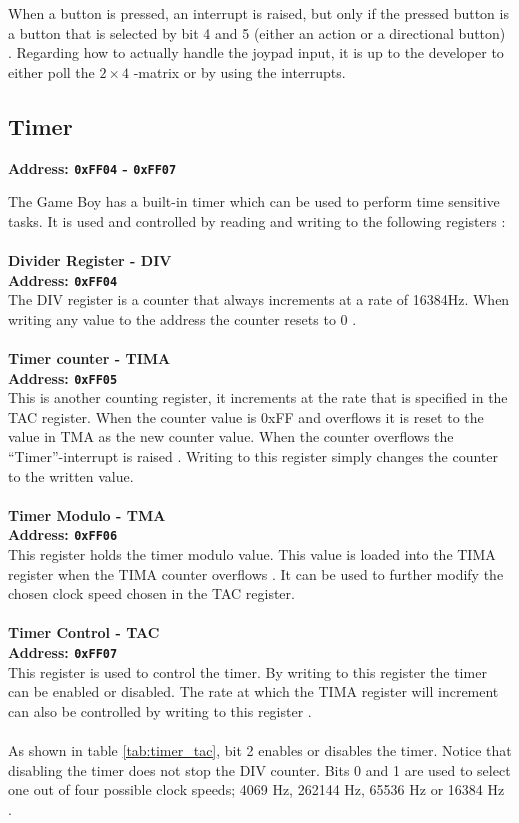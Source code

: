 When a button is pressed, an interrupt is raised, but only if the pressed button is a button that is selected by bit 4 and 5 (either an action or a directional button) \cite{pandocsjoypad}. Regarding how to actually handle the joypad input, it is up to the developer to either poll the $2 \times 4$ -matrix or by using the interrupts.

\subsection{Timer}
\label{sec:Timer}

\textbf{Address: \texttt{0xFF04} - \texttt{0xFF07}}

The Game Boy has a built-in timer which can be used to perform time sensitive tasks. 
It is used and controlled by reading and writing to the following registers \cite{pandocstimer}:
\\\\
\textbf{Divider Register - DIV}
\\
\textbf{Address: \texttt{0xFF04}}
\\
The DIV register is a counter that always increments at a rate of 16384Hz. 
When writing any value to the address the counter resets to 0 \cite{pandocstimer}.
\\\\
\textbf{Timer counter - TIMA}
\\
\textbf{Address: \texttt{0xFF05}}
\\
This is another counting register, it increments at the rate that is specified in the TAC register. 
When the counter value is 0xFF and overflows it is reset to the value in TMA as the new counter value.
When the counter overflows the ``Timer''-interrupt is raised \cite{pandocstimer}.
Writing to this register simply changes the counter to the written value.
\\\\
\textbf{Timer Modulo - TMA}
\\
\textbf{Address: \texttt{0xFF06}}
\\
This register holds the timer modulo value.
This value is loaded into the TIMA register when the TIMA counter overflows \cite{pandocstimer}.
It can be used to further modify the chosen clock speed chosen in the TAC register.
\\\\
\textbf{Timer Control - TAC}
\\
\textbf{Address: \texttt{0xFF07}}
\\
This register is used to control the timer.
By writing to this register the timer can be enabled or disabled. The rate at which the TIMA register will increment can also be controlled by writing to this register \cite{pandocstimer}. 
\\\\
As shown in table \ref{tab:timer_tac}, bit 2 enables or disables the timer. 
Notice that disabling the timer does not stop the DIV counter.
Bits 0 and 1 are used to select one out of four possible clock speeds; 4069 Hz, 262144 Hz, 65536 Hz or 16384 Hz \cite{pandocstimer}. 

